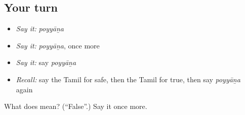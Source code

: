 \subsection*{Your turn}
\begin{itemize}
\raggedright
  \item \emph{Say it:} \emph{poyyāṉa}
  \item \emph{Say it:} \emph{poyyāṉa}, once more
  \item \emph{Say it:} say \emph{poyyāṉa}
  \item \emph{Recall:} say the Tamil for safe, then the Tamil for true, then say \emph{poyyāṉa} again
\end{itemize}

\begin{tcolorbox}[breakable,colback=teal!4,colframe=teal!35!black,title={Before you move on}]
What does  mean? (\textquotedblleft{}False\textquotedblright{}.) Say it once more.
\end{tcolorbox}
